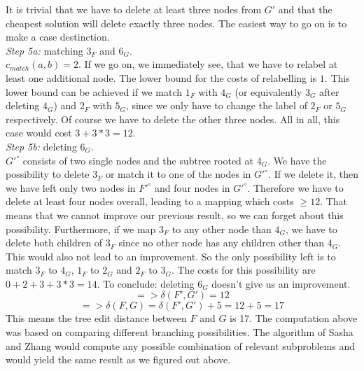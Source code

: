 It is trivial that we have to delete at least three nodes from $G'$ and that the cheapest solution will delete exactly three nodes. The easiest way to go on is to make a case destinction.\\
\textit{Step 5a:} matching $3_F$ and $6_G$.\\
$c_{match}(a,b)=2$. If we go on, we immediately see, that we have to relabel at least one additional node. The lower bound for the costs of relabelling is $1$. This lower bound can be achieved if we match $1_F$ with $4_G$ (or equivalently $3_G$ after deleting $4_G$) and $2_F$ with $5_G$, since we only have to change the label of $2_F$ or $5_G$ respectively. Of course we have to delete the other three nodes. All in all, this case would cost $3 + 3*3 = 12$.\\
\textit{Step 5b:} deleting $6_G$.\\
$G'^{\circ}$ consists of two single nodes and the subtree rooted at $4_G$. We have the possibility to delete $3_F$ or match it to one of the nodes in $G'^{\circ}$. If we delete it, then we have left only two nodes in $F'^{\circ}$ and four nodes in $G'^{\circ}$. Therefore we have to delete at least four nodes overall, leading to a mapping which costs $\geq 12$. That means that we cannot improve our previous result, so we can forget about this possibility. Furthermore, if we map $3_F$ to any other node than $4_G$, we have to delete both children of $3_F$ since no other node has any children other than $4_G$. This would also not lead to an improvement. So the only possibility left is to match $3_F$ to $4_G$, $1_F$ to $2_G$ and $2_F$ to $3_G$. The costs for this possibility are $0 + 2 + 3 + 3*3 = 14$. To conclude: deleting $6_G$ doesn't give us an improvement.
$$ => \delta(F',G') = 12$$
$$ => \delta(F,G) = \delta(F',G') + 5 = 12 + 5 = 17$$
This means the tree edit distance between $F$ and $G$ is 17. The computation above was based on comparing different branching possibilities. The algorithm of Sasha and Zhang would compute any possible combination of relevant subproblems and would yield the same result as we figured out above. 